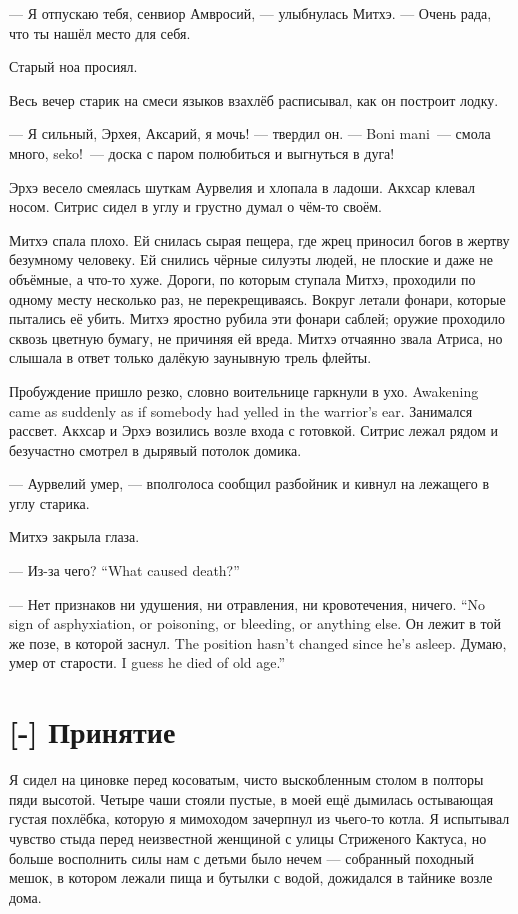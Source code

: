 --- Я отпускаю тебя, сенвиор Амвросий, --- улыбнулась Митхэ.
--- Очень рада, что ты нашёл место для себя.

Старый ноа просиял.

Весь вечер старик на смеси языков взахлёб расписывал, как он построит лодку.

--- Я сильный, Эрхея, Аксарий, я мочь! --- твердил он.
--- Boni mani\FM\ --- смола много, seko!\FM\ --- доска с паром полюбиться и выгнуться в дуга!

Эрхэ весело смеялась шуткам Аурвелия и хлопала в ладоши.
Акхсар клевал носом.
Ситрис сидел в углу и грустно думал о чём-то своём.

Митхэ спала плохо.
Ей снилась сырая пещера, где жрец приносил богов в жертву безумному человеку.
Ей снились чёрные силуэты людей, не плоские и даже не объёмные, а что-то хуже.
Дороги, по которым ступала Митхэ, проходили по одному месту несколько раз, не перекрещиваясь.
Вокруг летали фонари, которые пытались её убить.
Митхэ яростно рубила эти фонари саблей;
оружие проходило сквозь цветную бумагу, не причиняя ей вреда.
Митхэ отчаянно звала Атриса, но слышала в ответ только далёкую заунывную трель флейты.

{Пробуждение пришло резко, словно воительнице гаркнули в ухо.}
{Awakening came as suddenly as if somebody had yelled in the warrior's ear.}
Занимался рассвет.
Акхсар и Эрхэ возились возле входа с готовкой.
Ситрис лежал рядом и безучастно смотрел в дырявый потолок домика.

--- Аурвелий умер, --- вполголоса сообщил разбойник и кивнул на лежащего в углу старика.

Митхэ закрыла глаза.

{--- Из-за чего?}
{``What caused death?''}

{--- Нет признаков ни удушения, ни отравления, ни кровотечения, ничего.}
{``No sign of asphyxiation, or poisoning, or bleeding, or anything else.}
{Он лежит в той же позе, в которой заснул.}
{The position hasn't changed since he's asleep.}
{Думаю, умер от старости.}
{I guess he died of old age.''}

\section{[-] Принятие}

Я сидел на циновке перед косоватым, чисто выскобленным столом в полторы пяди высотой.
Четыре чаши стояли пустые, в моей ещё дымилась остывающая густая похлёбка, которую я мимоходом зачерпнул из чьего-то котла.
Я испытывал чувство стыда перед неизвестной женщиной с улицы Стриженого Кактуса, но больше восполнить силы нам с детьми было нечем --- собранный походный мешок, в котором лежали пища и бутылки с водой, дожидался в тайнике возле дома.

